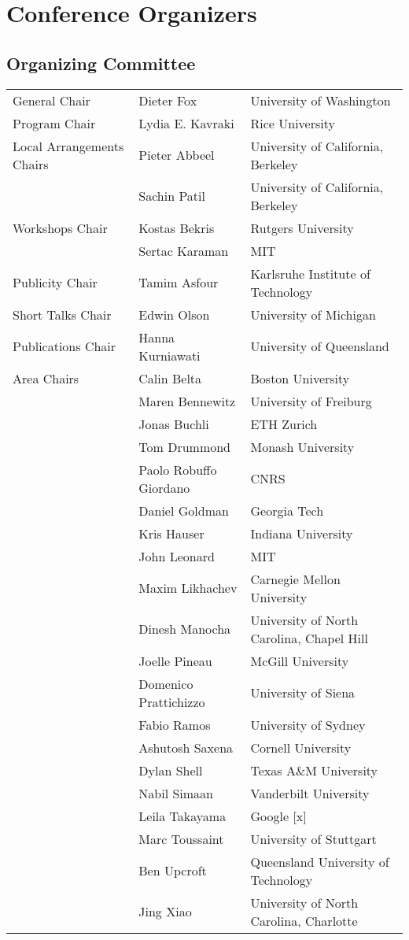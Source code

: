 \chapter{Conference Organizers}

\vspace{-1.6cm}
\section{Organizing Committee}

\begin{tabular}{>{\raggedleft}p{5cm}p{4.5cm}>{\small}p{7cm}}
General Chair & Dieter Fox & University of Washington\\
Program Chair & Lydia E. Kavraki & Rice University\\
Local Arrangements Chairs & Pieter Abbeel & University of California, Berkeley\\
& Sachin Patil & University of California, Berkeley\\
Workshops Chair & Kostas Bekris & Rutgers University\\
& Sertac Karaman & MIT\\
Publicity Chair & Tamim Asfour & Karlsruhe Institute of Technology\\
Short Talks Chair & Edwin Olson & University of Michigan\\
Publications Chair & Hanna Kurniawati & University of Queensland\\[5mm]

Area Chairs & Calin Belta & Boston University\\
& Maren Bennewitz & University of Freiburg\\
& Jonas Buchli & ETH Zurich\\
& Tom Drummond & Monash University\\
& Paolo Robuffo Giordano & CNRS \\
& Daniel Goldman & Georgia Tech \\
& Kris Hauser & Indiana University \\
& John Leonard & MIT \\
& Maxim Likhachev & Carnegie Mellon University \\
& Dinesh Manocha & University of North Carolina, Chapel Hill\\
& Joelle Pineau & McGill University \\
& Domenico Prattichizzo & University of Siena \\
& Fabio Ramos & University of Sydney \\
& Ashutosh Saxena & Cornell University \\
& Dylan Shell & Texas A\&M University \\
& Nabil Simaan & Vanderbilt University \\
& Leila Takayama & Google [x] \\
& Marc Toussaint & University of Stuttgart \\
& Ben Upcroft & Queensland University of Technology \\
& Jing Xiao & University of North Carolina, Charlotte\\[5mm]


\end{tabular}
